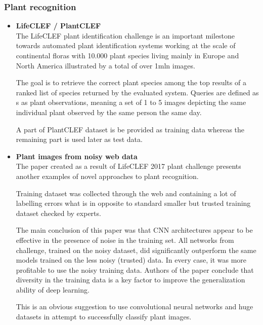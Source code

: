 \documentclass[../Main.tex]{subfiles}
\begin{document}
    \subsubsection{Plant recognition}
    \begin{itemize}
    
        \item \textbf{LifeCLEF / PlantCLEF} \\
        The LifeCLEF \cite{clef} plant identification challenge is an important milestone towards automated plant identification systems working at the scale of continental floras with 10.000 plant species living mainly in Europe and North America illustrated by a total of over 1mln images. 
        
        The goal is to retrieve the correct plant species among the top results of a ranked list of species returned by the evaluated system. Queries are defined as s as plant observations, meaning a set of 1 to 5 images depicting the same individual plant observed by the same person the same day.
        
        A part of PlantCLEF dataset is be provided as training data whereas the remaining part is used later as test data.
    
        \item \textbf{Plant images from noisy web data} \\
        The paper \cite{CLEF2017} created as a result of LifeCLEF 2017 plant challenge presents another examples of novel approaches to plant recognition.
        
        Training dataset was collected through the web and containing a lot of labelling errors what is in opposite to standard smaller but trusted training dataset checked by experts. 
        
        The main conclusion of this paper was that CNN architectures appear to be 
        effective in the presence of noise in the training set. All networks from challenge, trained on the noisy dataset, did significantly outperform the same models trained on the less noisy (trusted) data. In every case, it was more profitable to use the noisy training data. Authors of the paper conclude that diversity in the training data is a key factor to improve the generalization ability of deep learning.
        
        This is an obvious suggestion to use convolutional neural networks and huge datasets in attempt to successfully classify plant images.


\end{itemize}
\end{document}
